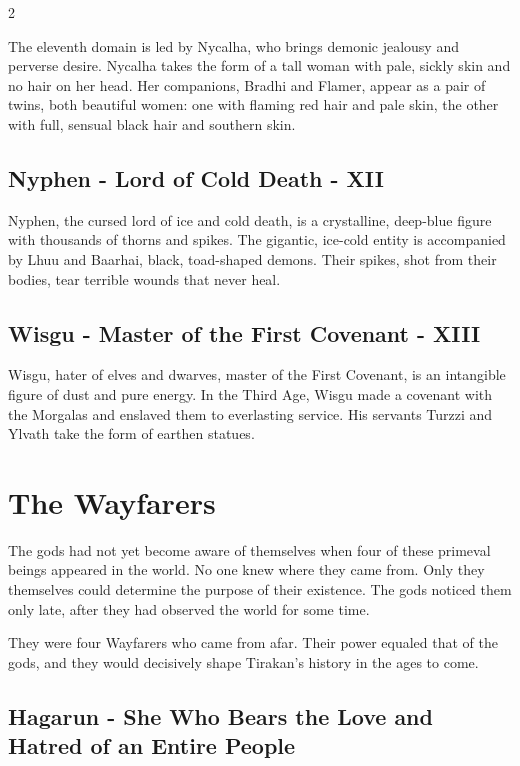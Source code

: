 \begin{multicols}{2}
{The eleventh domain is led by Nycalha, who brings demonic jealousy and perverse desire. Nycalha takes the form of a tall woman with pale, sickly skin and no hair on her head. Her companions, Bradhi and Flamer, appear as a pair of twins, both beautiful women: one with flaming red hair and pale skin, the other with full, sensual black hair and southern skin.

\subsection{Nyphen - Lord of Cold Death - XII}\label{subsec:nyphen-der-herr-des-kalten-todes}

Nyphen, the cursed lord of ice and cold death, is a crystalline, deep-blue figure with thousands of thorns and spikes. The gigantic, ice-cold entity is accompanied by Lhuu and Baarhai, black, toad-shaped demons. Their spikes, shot from their bodies, tear terrible wounds that never heal.

\subsection{Wisgu - Master of the First Covenant - XIII}\label{subsec:wisgu-gebieter-des-ersten-bundes}

Wisgu, hater of elves and dwarves, master of the First Covenant, is an intangible figure of dust and pure energy. In the Third Age, Wisgu made a covenant with the Morgalas and enslaved them to everlasting service. His servants Turzzi and Ylvath take the form of earthen statues.

\section{The Wayfarers}\label{sec:die-reisenden}

The gods had not yet become aware of themselves when four of these primeval beings appeared in the world. No one knew where they came from. Only they themselves could determine the purpose of their existence. The gods noticed them only late, after they had observed the world for some time.

They were four Wayfarers who came from afar. Their power equaled that of the gods, and they would decisively shape Tirakan's history in the ages to come.

\subsection{Hagarun - She Who Bears the Love and Hatred of an Entire People}\label{subsec:hagarun-die-die-liebe-und-den-hass-eines-ganzen-volkes-in-sich-tragt}

}
\end{multicols}
